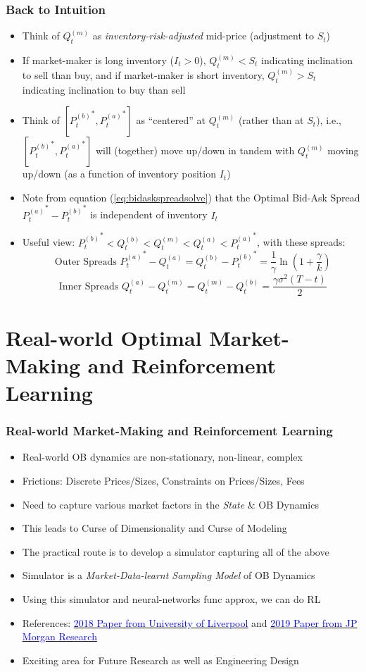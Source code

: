 \documentclass[handout]{beamer}
\begin{document}
\begin{frame}
\frametitle{Back to Intuition}
\pause
\begin{itemize}[<+->]
\item Think of $Q_t^{(m)}$ as {\em inventory-risk-adjusted} mid-price (adjustment to $S_t$)
\item If market-maker is long inventory ($I_t > 0$), $Q_t^{(m)} < S_t$ indicating inclination to sell than buy, and if market-maker is short inventory, $Q_t^{(m)} > S_t$ indicating inclination to buy than sell
\item Think of $[{P_t^{(b)}}^*, {P_t^{(a)}}^*]$ as ``centered'' at $Q_t^{(m)}$ (rather than at $S_t$), i.e., $[{P_t^{(b)}}^*, {P_t^{(a)}}^*]$ will (together) move up/down in tandem with $Q_t^{(m)}$ moving up/down (as a function of inventory position $I_t$)
\item Note from equation (\ref{eq:bidaskspreadsolve}) that the Optimal Bid-Ask Spread ${P_t^{(a)}}^* - {P_t^{(b)}}^*$ is independent of inventory $I_t$
\item Useful view: ${P_t^{(b)}}^* < Q_t^{(b)} < Q_t^{(m)} < Q_t^{(a)} < {P_t^{(a)}}^*$, with these spreads:
$$\mbox{ Outer Spreads } {P_t^{(a)}}^* - Q_t^{(a)} = Q_t^{(b)}  - {P_t^{(b)}}^* = \frac 1 {\gamma} \ln{(1 + \frac {\gamma} k)}$$
$$\mbox{ Inner Spreads } Q_t^{(a)} - Q_t^{(m)} = Q_t^{(m)} - Q_t^{(b)} = \frac {\gamma \sigma^2(T-t)} 2$$
\end{itemize}
\end{frame}


\section{Real-world Optimal Market-Making and Reinforcement Learning}

\begin{frame}
\frametitle{Real-world Market-Making and Reinforcement Learning}
\pause
\begin{itemize}[<+->]
\item Real-world OB dynamics are non-stationary, non-linear, complex
\item Frictions: Discrete Prices/Sizes, Constraints on Prices/Sizes, Fees
\item Need to capture various market factors in the {\em State} \& OB Dynamics
\item This leads to Curse of Dimensionality and Curse of Modeling
\item The practical route is to develop a simulator capturing all of the above
\item Simulator is a {\em Market-Data-learnt Sampling Model} of OB Dynamics 
\item Using this simulator and neural-networks func approx, we can do RL
\item References: \href{https://arxiv.org/pdf/1804.04216.pdf}{\underline{\textcolor{blue}{2018 Paper from University of Liverpool}}} and 
\href{https://arxiv.org/pdf/1911.05892.pdf}{\underline{\textcolor{blue}{2019 Paper from JP Morgan Research}}}
\item Exciting area for Future Research as well as Engineering Design
\end{itemize}
\end{frame}
\end{document}
